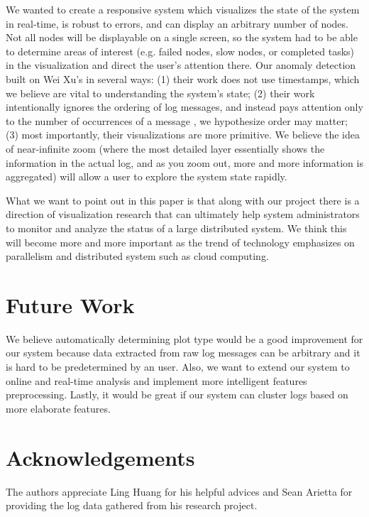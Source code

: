 \documentclass[conference]{acmsiggraph}
\begin{document}
We wanted to create a responsive system which visualizes the state of the system in real-time, is
robust to errors, and can display an arbitrary number of nodes. Not all nodes will be displayable on
a single screen, so the system had to be able to determine areas of interest (e.g. failed nodes,
slow nodes, or completed tasks) in the visualization and direct the user’s attention there. Our
anomaly detection built on Wei Xu's in several ways: (1) their work does not use timestamps, which
we believe are vital to understanding the system’s state; (2) their work intentionally ignores the
ordering of log messages, and instead pays attention only to the number of occurrences of a message
, we hypothesize order may matter; (3) most importantly, their visualizations are more primitive. We
believe the idea of near-infinite zoom (where the most detailed layer essentially shows the
information in the actual log, and as you zoom out, more and more information is aggregated) will
allow a user to explore the system state rapidly.

What we want to point out in this paper is that along with our project there is a direction of
visualization research that can ultimately help system administrators to monitor and analyze the
status of a large distributed system. We think this will become more and more important as the trend
of technology emphasizes on parallelism and distributed system such as cloud computing.


\section{Future Work}

We believe automatically determining plot type would be a good improvement for our system because
data extracted from raw log messages can be arbitrary and it is hard to be predetermined by an user.
Also, we want to extend our system to online and real-time analysis and implement more intelligent
features preprocessing. Lastly, it would be great if our system can cluster logs based on more
elaborate features.


\section*{Acknowledgements}
The authors appreciate Ling Huang for his helpful advices and Sean Arietta for providing the log
data gathered from his research project.




\end{document}
